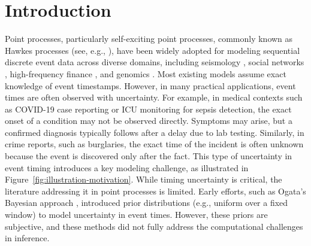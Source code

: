 \documentclass[11pt]{article}
\theoremstyle{remark}
\theoremstyle{plain}
\begin{document}






\section{Introduction}


Point processes, particularly self-exciting point processes, commonly known as Hawkes processes (see, e.g., \cite{hawkes1971spectra, reinhart2018review}), have been widely adopted for modeling sequential discrete event data across diverse domains, including seismology \cite{ogata1988statistical, ogata1999seismicity, zhuang2011next}, social networks \cite{farajtabar2014shaping}, high-frequency finance \cite{bacry2013some}, and genomics \cite{reynaud2010adaptive}.
%
Most existing models assume exact knowledge of event timestamps. However, in many practical applications, event times are often observed with uncertainty. For example, in medical contexts such as COVID-19 case reporting or ICU monitoring for sepsis detection, the exact onset of a condition may not be observed directly. Symptoms may arise, but a confirmed diagnosis typically follows after a delay due to lab testing. Similarly, in crime reports, such as burglaries, the exact time of the incident is often unknown because the event is discovered only after the fact. This type of uncertainty in event timing introduces a key modeling challenge, as illustrated in Figure~\ref{fig:illustration-motivation}.
%
While timing uncertainty is critical, the literature addressing it in point processes is limited. Early efforts, such as Ogata’s Bayesian approach \cite{ogata1999estimating}, introduced prior distributions (e.g., uniform over a fixed window) to model uncertainty in event times. However, these priors are subjective, and these methods did not fully address the computational challenges in inference.
\end{document}
